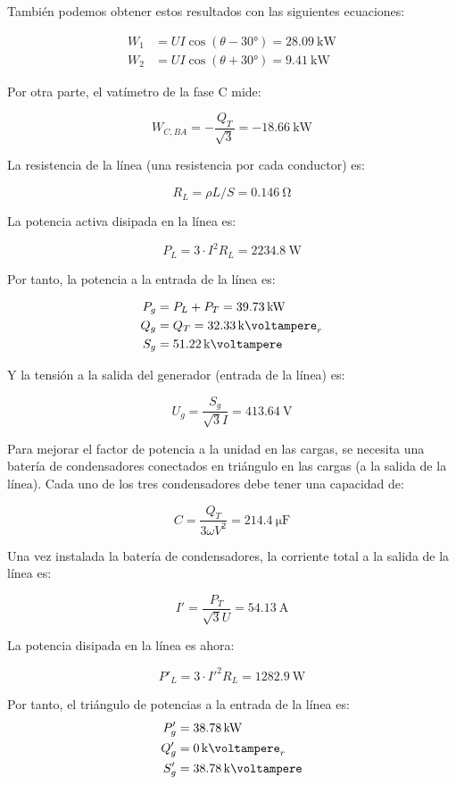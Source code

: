 \documentclass[12pt]{article}
\begin{document}
También podemos obtener estos resultados con las siguientes
ecuaciones:

\begin{align*}
  W_1 &= U I \cos(\theta - \ang{30}) = \SI{28.09}{\kilo\watt}\\
  W_2 &= U I \cos(\theta + \ang{30}) = \SI{9.41}{\kilo\watt}
\end{align*}

Por otra parte, el vatímetro de la fase C mide:

\[
  W_{C, BA} = - \frac{Q_T}{\sqrt{3}} = - \SI{18.66}{\kilo\watt}
\]

La resistencia de la línea (una resistencia por cada conductor) es:

\[
R_L = \rho L/S = \SI{0.146}{\ohm}
\]

La potencia activa disipada en la línea es:

\[
P_L = 3 \cdot I^2 R_L = \SI{2234.8}{\watt}
\]

Por tanto, la potencia a la entrada de la línea es:

\begin{align*}
P_g &= P_L + P_T = \SI{39.73}{\kilo\watt}\\
Q_g &= Q_T = \SI{32.33}{\kilo\voltampere}_r\\
S_g &= \SI{51.22}{\kilo\voltampere}
\end{align*}

Y la tensión a la salida del generador (entrada de la línea) es:

\[
U_g = \frac{S_g}{\sqrt{3} I} = \SI{413.64}{\volt}
\]

Para mejorar el factor de potencia a la unidad en las cargas, se necesita una batería de condensadores conectados en triángulo en las cargas (a la salida de la línea). Cada uno de los tres condensadores debe tener una capacidad de:

\[
C = \frac{Q_T}{3 \omega V^2} = \SI{214.4}{\micro\farad}
\]

Una vez instalada la batería de condensadores, la corriente total a la salida de la línea es:

\[
I' = \frac{P_T}{\sqrt{3} U} = \SI{54.13}{\ampere}
\]

La potencia disipada en la línea es ahora:

\[
P'_L = 3 \cdot I'^2 R_L = \SI{1282.9}{\watt} 
\]

Por tanto, el triángulo de potencias a la entrada de la línea es:
\begin{align*}
P'_g &= \SI{38.78}{\kilo\watt}\\
Q'_g &= \SI{0}{\kilo\voltampere}_r\\
S'_g &= \SI{38.78}{\kilo\voltampere}
\end{align*}
\end{document}
